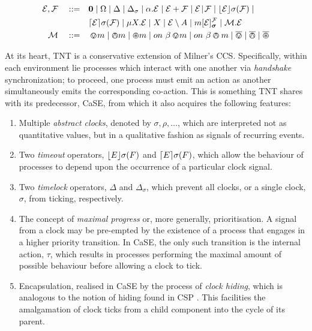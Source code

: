 \documentclass[orivec,envcountsame]{llncs}
\begin{document}
\begin{equation}
  \begin{aligned}
    \expr, \exprb \quad \mathrel{::=} \quad &
      \nil  \mid
      \Omega \mid
      \Delta \mid
      \Delta_{\sigma} \mid
      \alpha . \expr  \mid
      \expr + \exprb \mid
      \expr \mathrel{\!|\!} \exprb \mid
      \timeout{\expr}{\sigma}{\exprb} \mid \\
    & \stimeout{\expr}{\sigma}{\exprb} \mid 
      \mu X . \expr \mid
      X \mid 
      \expr \res{A} \mid
      \locv{m}{\expr}{\exprb}{\vec{\sigma}} \mid
      \ambop . \expr \\
   \ambop \quad \mathrel{::=} \quad & \tntin{m} \mid \tntout{m} \mid \tntopen{m} \mid
      \procin{\beta}{m} \mid \procout{\beta}{m} \mid \bin \mid
      \bout \mid \bopen
   \end{aligned}
   \label{eqn:tnt-syntax}
\end{equation}


At its heart, TNT is a conservative extension of Milner's CCS.
Specifically, within each environment lie processes which interact with
one another via \emph{handshake} synchronization; to proceed, one
process must emit an action as another simultaneously emits the
corresponding co-action.  This is something TNT shares with its
predecessor, CaSE, from which it also acquires the following features:

\begin{enumerate}
\item Multiple \emph{abstract clocks}, denoted by $\sigma, \rho, \dots$,
      which are interpreted not as quantitative values, but in a
      qualitative fashion as signals of recurring events.
\item Two \emph{timeout} operators, $\lfloor{E}\rfloor {\sigma} ({F})$ and
      $\lceil{E}\rceil {\sigma} ({F})$, which allow the behaviour of
      processes to depend upon the occurrence of a particular clock
      signal.
\item Two \emph{timelock} operators, $\Delta$ and $\Delta_{\sigma}$,
      which prevent all clocks, or a single
      clock, $\sigma$, from ticking, respectively.
\item The concept of \emph{maximal progress} or, more generally,
      prioritisation.  A signal from a clock may be pre-empted by the
      existence of a process that engages in a higher priority
      transition.  In CaSE, the only such transition is the internal action,
      $\tau$, which results in processes performing the maximal amount
      of possible behaviour before allowing a clock to tick.
\item Encapsulation, realised in CaSE by the process of \emph{clock
      hiding}, which is analogous to the notion of hiding found in
      CSP \cite{hoare:csp78}.  This facilities the amalgamation of clock ticks
      from a child component into the cycle of its parent.
\end{enumerate}
\end{document}
